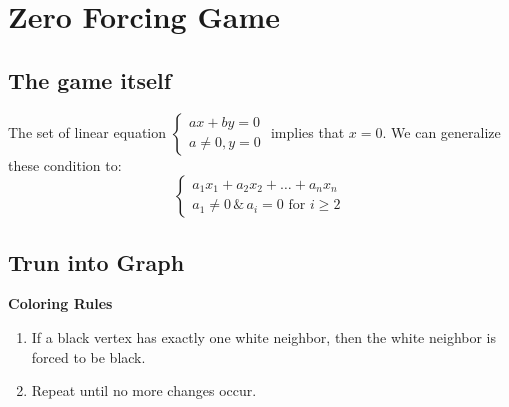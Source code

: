\documentclass[11pt]{article}
\begin{document}
\begin{center}
    \tableofcontents
\end{center}
\setcounter{page}{1}
\newpage
\section{Zero Forcing Game}
\subsection{The game itself}
The set of linear equation 
$\begin{cases}
    ax+by=0\\
    a\neq 0, y= 0
\end{cases}$ implies that $x=0$. We can generalize these condition to: 
\[
    \begin{cases}
        a_1x_1+a_2x_2+\dots+a_nx_n\\
        a_1 \neq 0 \, \& \, a_i = 0 \text{ for } i \geq 2
    \end{cases}
\]
\subsection{Trun into Graph}
\vspace{10pt}
\begin{minipage}{.3\textwidth}
    \centering
\end{minipage}
\hfill
\begin{minipage}{.6\textwidth}
    \vspace{0pt}
    \textbf{Coloring Rules}
    \begin{enumerate}
        \item If a black vertex has exactly one white neighbor, then the white neighbor is forced to be black.
        \item Repeat until no more changes occur.
    \end{enumerate}
\end{minipage}
\end{document}
